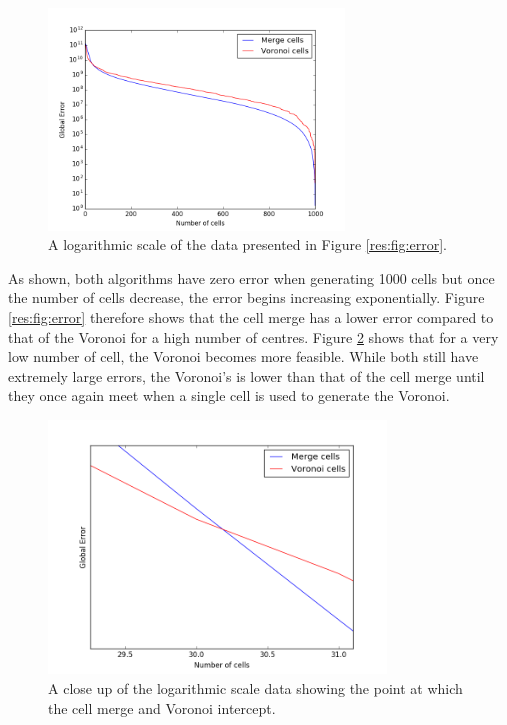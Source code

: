 \begin{figure}[H]
\centering
\includegraphics[width=0.7\textwidth]{Images/result_error_log.png}
\caption{A logarithmic scale of the data presented in Figure \ref{res:fig:error}.}
\label{res:fig:error_log}
\end{figure}
As shown, both algorithms have zero error when generating 1000 cells but once the number of cells decrease, the error begins increasing exponentially. Figure \ref{res:fig:error} therefore shows that the cell merge has a lower error compared to that of the Voronoi for a high number of centres. Figure \ref{res:fig:error_log_z} shows that for a very low number of cell, the Voronoi becomes more feasible. While both still have extremely large errors, the Voronoi's is lower than that of the cell merge until they once again meet when a single cell is used to generate the Voronoi.
\begin{figure}[H]
\centering
\includegraphics[width=0.8\textwidth]{Images/result_error_log_zoom.png}
\caption{A close up of the logarithmic scale data showing the point at which the cell merge and Voronoi intercept.}
\label{res:fig:error_log_z}
\end{figure}